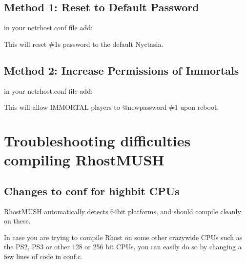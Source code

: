 \documentclass[letterpaper,10pt,english]{sphinxmanual}
\begin{document}
\subsection{Method 1: Reset to Default Password}
\label{\detokenize{troubleshooting:method-1-reset-to-default-password}}
\sphinxAtStartPar
in your netrhost.conf file add:

\begin{sphinxVerbatim}[commandchars=\\\{\}]
 
\end{sphinxVerbatim}

\sphinxAtStartPar
This will reset \#1\textquotesingle{}s password to the default \textquotesingle{}Nyctasia\textquotesingle{}.


\subsection{Method 2: Increase Permissions of Immortals}
\label{\detokenize{troubleshooting:method-2-increase-permissions-of-immortals}}
\sphinxAtStartPar
in your netrhost.conf file add:

\begin{sphinxVerbatim}[commandchars=\\\{\}]
 
\end{sphinxVerbatim}

\sphinxAtStartPar
This will allow IMMORTAL players to @newpassword \#1 upon reboot.


\section{Troubleshooting difficulties compiling RhostMUSH}
\label{\detokenize{troubleshooting:troubleshooting-difficulties-compiling-rhostmush}}

\subsection{Changes to conf for high\sphinxhyphen{}bit CPUs}
\label{\detokenize{troubleshooting:changes-to-conf-for-high-bit-cpus}}
\sphinxAtStartPar
RhostMUSH automatically detects 64\sphinxhyphen{}bit platforms, and should compile
cleanly on these.

\sphinxAtStartPar
In case you are trying to compile Rhost on some other crazy\sphinxhyphen{}wide CPUs
such as the PS2, PS3 or other 128 or 256 bit CPUs, you can easily do
so by changing a few lines of code in conf.c.
\end{document}
